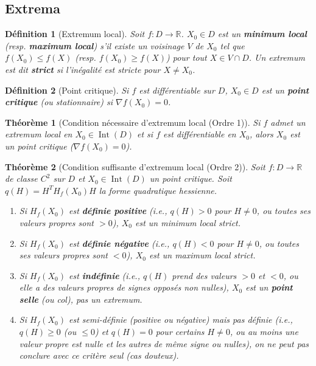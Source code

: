 \documentclass[a4paper]{article}
\newcommand{\R}{\mathbb{R}}
\newtheorem{theorem}{Théorème}[section]
\newtheorem{definition}{Définition}[section]
\begin{document}
\subsection{Extrema}
\begin{definition}[Extremum local]
    Soit \(f: D \to \R\). \(X_0 \in D\) est un \textbf{minimum local} (resp. \textbf{maximum local}) s'il existe un voisinage \(V\) de \(X_0\) tel que \(f(X_0) \le f(X)\) (resp. \(f(X_0) \ge f(X)\)) pour tout \(X \in V \cap D\). Un extremum est dit \textbf{strict} si l'inégalité est stricte pour \(X \neq X_0\).
\end{definition}
\begin{definition}[Point critique]
    Si \(f\) est différentiable sur \(D\), \(X_0 \in D\) est un \textbf{point critique} (ou stationnaire) si \(\nabla f(X_0) = 0\).
\end{definition}
\begin{theorem}[Condition nécessaire d'extremum local (Ordre 1)]
    Si \(f\) admet un extremum local en \(X_0 \in \operatorname{Int}(D)\) et si \(f\) est différentiable en \(X_0\), alors \(X_0\) est un point critique (\(\nabla f(X_0)=0\)).
\end{theorem}
\begin{theorem}[Condition suffisante d'extremum local (Ordre 2)]
    Soit \(f:D \to \R\) de classe \(C^2\) sur \(D\) et \(X_0 \in \operatorname{Int}(D)\) un point critique. Soit \(q(H) = H^T H_f(X_0) H\) la forme quadratique hessienne.
    \begin{enumerate}
        \item Si \(H_f(X_0)\) est \textbf{définie positive} (i.e., \(q(H)>0\) pour \(H \neq 0\), ou toutes ses valeurs propres sont \(>0\)), \(X_0\) est un minimum local strict.
        \item Si \(H_f(X_0)\) est \textbf{définie négative} (i.e., \(q(H)<0\) pour \(H \neq 0\), ou toutes ses valeurs propres sont \(<0\)), \(X_0\) est un maximum local strict.
        \item Si \(H_f(X_0)\) est \textbf{indéfinie} (i.e., \(q(H)\) prend des valeurs \(>0\) et \(<0\), ou elle a des valeurs propres de signes opposés non nulles), \(X_0\) est un \textbf{point selle} (ou col), pas un extremum.
        \item Si \(H_f(X_0)\) est semi-définie (positive ou négative) mais pas définie (i.e., \(q(H) \ge 0\) (ou \(\le 0\)) et \(q(H)=0\) pour certains \(H \neq 0\), ou au moins une valeur propre est nulle et les autres de même signe ou nulles), on ne peut pas conclure avec ce critère seul (cas douteux).
    \end{enumerate}
\end{theorem}
\end{document}
